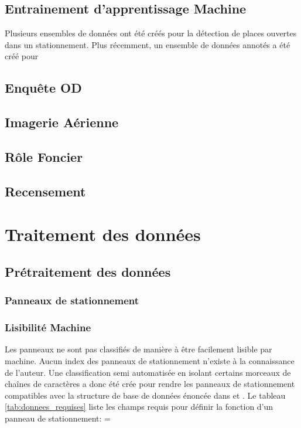  \subsection{Entrainement d'apprentissage Machine}
    Plusieurs ensembles de données ont été créés pour la détection de places ouvertes dans un stationnement. Plus récemment, un ensemble de données annotés a été créé pour 
  \subsection{Enquête OD}
  \subsection{Imagerie Aérienne}
  \subsection{Rôle Foncier}
  \subsection{Recensement}
\section{Traitement des données}
  \subsection{Prétraitement des données}
    \subsubsection{Panneaux de stationnement}
      \subsubsection{Lisibilité Machine}
        Les panneaux ne sont pas classifiés de manière à être facilement lisible par machine. Aucun index des panneaux de stationnement n'existe à la connaissance de l'auteur. Une classification semi automatisée en isolant certains morceaux de chaînes de caractères a donc été crée pour rendre les panneaux de stationnement compatibles avec la structure de base de données énoncée dans \textcite{Bourdeau:MethodologieAnalyse:2014} et \textcite{Morency:DeveloppementMise:2022}. Le tableau \ref{tab:donnees_requises} liste les champs requis pour définir la fonction d'un panneau de stationnement:
        \LTcapwidth=\textwidth

